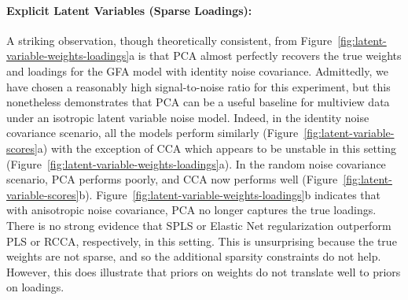 \paragraph{Explicit Latent Variables (Sparse Loadings):} A striking observation, though theoretically consistent, from Figure~\ref{fig:latent-variable-weights-loadings}a is that PCA almost perfectly recovers the true weights and loadings for the GFA model with identity noise covariance.
Admittedly, we have chosen a reasonably high signal-to-noise ratio for this experiment, but this nonetheless demonstrates that PCA can be a useful baseline for multiview data under an isotropic latent variable noise model.
Indeed, in the identity noise covariance scenario, all the models perform similarly (Figure~\ref{fig:latent-variable-scores}a) with the exception of CCA which appears to be unstable in this setting (Figure~\ref{fig:latent-variable-weights-loadings}a).
In the random noise covariance scenario, PCA performs poorly, and CCA now performs well (Figure~\ref{fig:latent-variable-scores}b).
Figure~\ref{fig:latent-variable-weights-loadings}b indicates that with anisotropic noise covariance, PCA no longer captures the true loadings.
There is no strong evidence that SPLS or Elastic Net regularization outperform PLS or RCCA, respectively, in this setting.
This is unsurprising because the true weights are not sparse, and so the additional sparsity constraints do not help.
However, this does illustrate that priors on weights do not translate well to priors on loadings.

